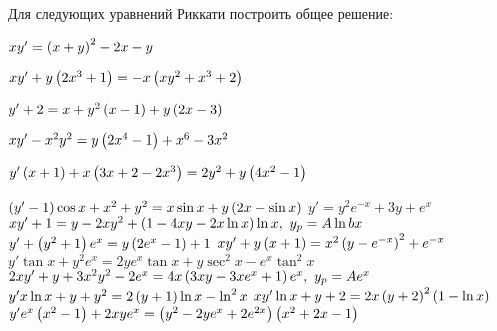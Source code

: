 	Для следующих уравнений Риккати построить общее решение:
	\begin{enumtasks}

		\item \( xy' = \left( x + y \right)^2 - 2x - y \) 																	%
		\item \( xy' + y \left( 2x^3 + 1 \right) = -x \left( xy^2 + x^3 + 2 \right) \) 											%
		\item \( y' + 2 = x + y^2 \left( x - 1 \right) + y \left( 2x - 3 \right) \) 												%
		\item \( xy' - x^2 y^2 = y \left( 2x^4 - 1 \right) + x^6 - 3x^2 \) 												%
		\item \( y' \left( x + 1 \right) + x \left( 3x + 2 - 2x^3 \right) = 2 y^2 + y \left( 4x^2 - 1 \right) \) 						%
		\item \( \left( y' - 1 \right) \cos{x} + x^2 + y^2 = x \sin{x} + y \left( 2x - \sin{x} \right) \) 						%
		\itemstar \( y' = y^2 e^{-x} + 3y + e^{x} \) 																%
		\itemstar \( xy' + 1 = y - 2xy^2 + \left( 1 - 4xy - 2x \ln{x} \right) \ln{x}, ~ y_p = A \ln{bx} \)					%
		\itemstar \( y' + \left( y^2 + 1 \right) e^{x} = y \left( 2e^{x} - 1 \right) + 1 \) 										%
		\itemstar \( xy' + y \left( x + 1 \right) = x^2 \left( y - e^{-x} \right)^2 + e^{-x} \) 									%
		\itemstar \( y' \tan{x} + y^2 e^{x} = 2ye^{x} \tan{x} + y \sec^2{x} - e^{x} \tan^2{x} \)					%
		\itemstar \( 2xy' + y + 3 x^2 y^{2} - 2e^{x} = 4 x \left( 3xy - 3xe^{x} + 1 \right) e^{x}, ~ y_p = Ae^{x} \)		%
		\itemstar \( y' x \ln{x} + y + y^2 = 2 \left( y + 1 \right) \ln{x} - \ln^2{x} \) 									%
		\itemstar \( xy' \ln{x} + y + 2 = 2x\left( y + 2 \right)^2 \left( 1 - \ln{x} \right) \)									%
		\itemstar \( y' e^{x} \left( x^2 - 1 \right) + 2xye^{x} = \left( y^2 - 2ye^{x} + 2e^{2x} \right) \left( x^2 + 2 x - 1 \right) \)	%

	\end{enumtasks}
